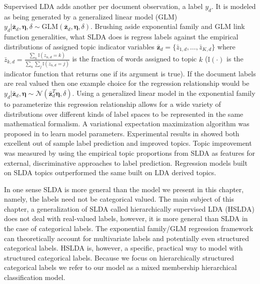 Supervised LDA adds another per document observation, a label $y_d$.  It is modeled as being generated by a generalized linear model (GLM) $y_d | \bar{{\mathbf z}}_d, \boldsymbol\eta,\delta \sim \mathrm{GLM}(\bar{\mathbf{z}}_d,\boldsymbol\eta,\delta)$.  Brushing aside exponential family and GLM link function generalities, what SLDA does is regress labels against the empirical distributions of assigned topic indicator variables $\bar{\mathbf{z}}_d = \{\bar{z}_{1,d}, \ldots, \bar{z}_{K,d}\}$ where $\bar{z}_{k,d} = \frac{\sum_n \mathbb{I}(z_{n,d}=k)}{\sum_n \sum_j \mathbb{I}(z_{n,d}=j)}$ is the fraction of words assigned to topic $k$ ($\mathbb{I}(\cdot)$ is the indicator function that returns one if its argument is true).
If the document labels are real valued then one example choice for the regression relationship would be $y_d | {\bar{\mathbf z}}_d, \boldsymbol\eta \sim \mathcal{N}(\bar{\mathbf{z}}_d^T\boldsymbol\eta,\delta).$  Using a generalized linear model in the exponential family to parameterize this regression relationship allows for a wide variety of distributions over different kinds of label spaces to be represented in the same mathematical formalism.   A variational expectation maximization algorithm was proposed in \cite{BleiMcAuliffe2008} to learn model parameters.  Experimental results in \cite{BleiMcAuliffe2008}  showed both excellent out of sample label prediction and improved topics.  Topic improvement was measured by using the empirical topic proportions from SLDA  as features for external, discriminative approaches to label prediction.  Regression models built on SLDA topics outperformed the same built on LDA derived topics.

In one sense SLDA is more general than the model we present in this chapter, namely, the labels need not be categorical valued.  %
The main subject of this chapter, a generalization of SLDA called hierarchically supervised LDA (HSLDA) \cite{Perotte-2012-NIPS} does not deal with real-valued labels, however, it is more general than SLDA in the case of categorical labels.  The exponential family/GLM regression framework can theoretically account for multivariate labels and potentially even structured categorical labels.   HSLDA is, however,  a specific, practical way to model with structured categorical labels.  Because we focus on hierarchically structured categorical labels we refer to our model as a mixed membership hierarchical classification model. 

